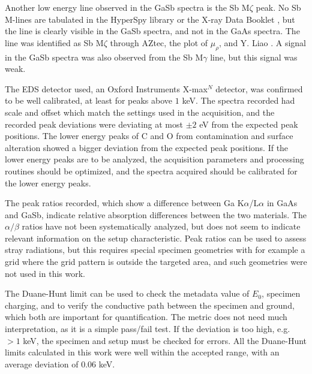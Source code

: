 Another low energy line observed in the GaSb spectra is the Sb M$\zeta$ peak.
No Sb M-lines are tabulated in the HyperSpy library \cite{hyperspy_1.7.1} or the X-ray Data Booklet \cite{thompson_x-ray_2004}, but the line is clearly visible in the GaSb spectra, and not in the GaAs spectra.
The line was identified as Sb M$\zeta$ through AZtec, the plot of $\mu_\rho$, and Y. Liao \cite{liao2006practical}.
A signal in the GaSb spectra was also observed from the Sb M$\gamma$ line, but this signal was weak.

The EDS detector used, an Oxford Instruments X-max$^N$ detector, was confirmed to be well calibrated, at least for peaks above $1$ keV.
The spectra recorded had scale and offset which match the settings used in the acquisition, and the recorded peak deviations were deviating at most $\pm 2$ eV from the expected peak positions.
The lower energy peaks of C and O from contamination and surface alteration showed a bigger deviation from the expected peak positions.
If the lower energy peaks are to be analyzed, the acquisition parameters and processing routines should be optimized, and the spectra acquired should be calibrated for the lower energy peaks.


The peak ratios recorded, which show a difference between Ga K$\alpha$/L$\alpha$ in GaAs and GaSb, indicate relative absorption differences between the two materials.
The $\alpha/\beta$ ratios have not been systematically analyzed, but does not seem to indicate relevant information on the setup characteristic.
Peak ratios can be used to assess stray radiations, but this requires special specimen geometries with for example a grid where the grid pattern is outside the targeted area, and such geometries were not used in this work.

The Duane-Hunt limit can be used to check the metadata value of $E_0$, specimen charging, and to verify the conductive path between the specimen and ground, which both are important for quantification.
The metric does not need much interpretation, as it is a simple pass/fail test.
If the deviation is too high, e.g. $>1$ keV, the specimen and setup must be checked for errors.
All the Duane-Hunt limits calculated in this work were well within the accepted range, with an average deviation of $0.06$ keV.

